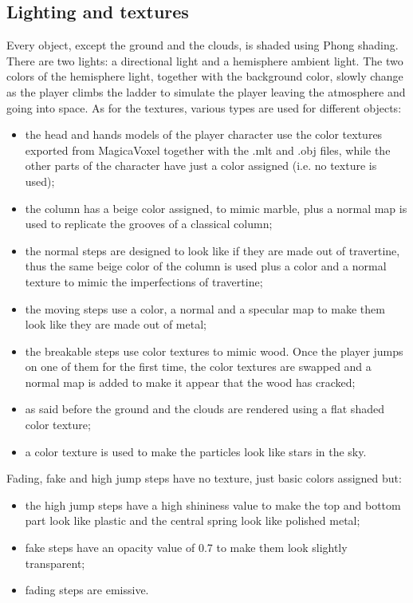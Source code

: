 \documentclass[12pt]{article}
\begin{document}
\subsection{Lighting and textures}
Every object, except the ground and the clouds, is shaded using Phong shading. There are two lights: a directional light and a hemisphere ambient light. The two colors of the hemisphere light, together with the background color, slowly change as the player climbs the ladder to simulate the player leaving the atmosphere and going into space. 
As for the textures, various types are used for different objects:
\begin{itemize}
\item the head and hands models of the player character use the color textures exported from MagicaVoxel together with the .mlt and .obj files, while the other parts of the character have just a color assigned (i.e. no texture is used);
\item the column has a beige color assigned, to mimic marble, plus a normal map is used to replicate the grooves of a classical column;
\item the normal steps are designed to look like if they are made out of travertine, thus the same beige color of the column is used plus a color and a normal texture to mimic the imperfections of travertine;
\item the moving steps use a color, a normal and a specular map to make them look like they are made out of metal;
\item the breakable steps use color textures to mimic wood. Once the player jumps on one of them for the first time, the color textures are swapped and a normal map is added to make it appear that the wood has cracked;
\item as said before the ground and the clouds are rendered using a flat shaded color texture;
\item a color texture is used to make the particles look like stars in the sky.
\end{itemize}
Fading, fake and high jump steps have no texture, just basic colors assigned but:
\begin{itemize}
\item the high jump steps have a high shininess value to make the top and bottom part look like plastic and the central spring look like polished metal;
\item fake steps have an opacity value of 0.7 to make them look slightly transparent;
\item fading steps are emissive.
\end{itemize}
\end{document}
